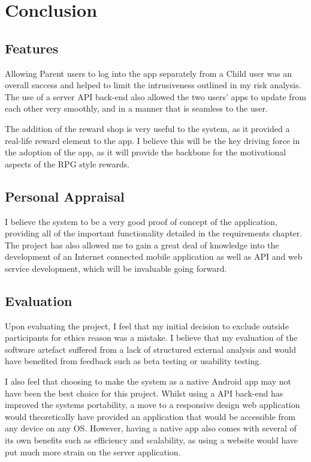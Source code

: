 \chapter{Conclusion}
\section{Features}
Allowing Parent users to log into the app separately from a Child user was an overall success and helped to limit the intrusiveness outlined in my risk analysis.
The use of a server API back-end also allowed the two users' apps to update from each other very smoothly, and in a manner that is seamless to the user.

The addition of the reward shop is very useful to the system, as it provided a real-life reward element to the app.
I believe this will be the key driving force in the adoption of the app, as it will provide the backbone for the motivational aspects of the RPG style rewards.

\section{Personal Appraisal}
I believe the system to be a very good proof of concept of the application, providing all of the important functionality detailed in the requirements chapter.
The project has also allowed me to gain a great deal of knowledge into the development of an Internet connected mobile application as well as API and web service development, which will be invaluable going forward.

\section{Evaluation}
Upon evaluating the project, I feel that my initial decision to exclude outside participants for ethics reason was a mistake. 
I believe that my evaluation of the software artefact suffered from a lack of structured external analysis and would have benefited from feedback such as beta testing or usability testing. 

I also feel that choosing to make the system as a native Android app may not have been the best choice for this project.
Whilst using a API back-end has improved the systems portability, a move to a responsive design web application would theoretically have provided an application that would be accessible from any device on any OS.
However, having a native app also comes with several of its own benefits such as efficiency and scalability, as using a website would have put much more strain on the server application.

